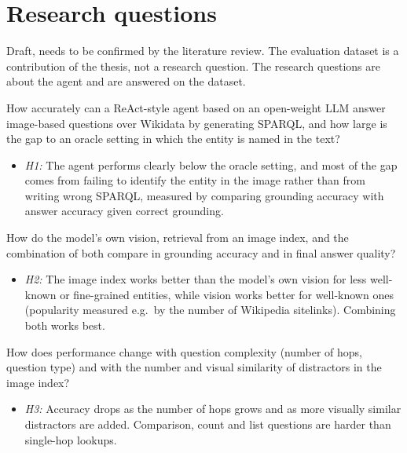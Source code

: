 \documentclass[a4paper,11pt]{article}
\begin{document}
\section{Research questions}

Draft, needs to be confirmed by the literature review. The evaluation dataset
is a contribution of the thesis, not a research question. The research
questions are about the agent and are answered on the dataset.

\begin{description}[style=nextline,leftmargin=1.5em]
  \item[RQ1 (agent)] How accurately can a ReAct-style agent based on an
    open-weight LLM answer image-based questions over Wikidata by generating
    SPARQL, and how large
    is the gap to an oracle setting in which the entity is named in the text?
    \begin{itemize}
      \item \emph{H1:} The agent performs clearly below the oracle setting,
        and most of the gap comes from failing to identify the entity in the
        image rather than from writing wrong SPARQL, measured by comparing
        grounding accuracy with answer accuracy given correct grounding.
    \end{itemize}
  \item[RQ2 (grounding)] How do the model's own vision, retrieval from an
    image index, and the combination of both compare in grounding accuracy
    and in final answer quality?
    \begin{itemize}
      \item \emph{H2:} The image index works better than the model's own
        vision for less well-known or fine-grained entities, while vision
        works better for well-known ones (popularity measured e.g.\ by the
        number of Wikipedia sitelinks). Combining both works best.
    \end{itemize}
  \item[RQ3 (difficulty)] How does performance change with question
    complexity (number of hops, question type) and with the number and visual
    similarity of distractors in the image index?
    \begin{itemize}
      \item \emph{H3:} Accuracy drops as the number of hops grows and as more
        visually similar distractors are added. Comparison, count and list
        questions are harder than single-hop lookups.
    \end{itemize}
\end{description}
\end{document}
